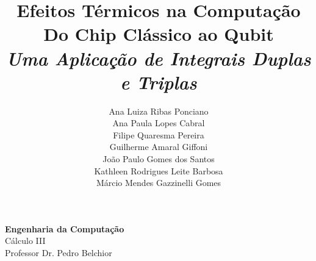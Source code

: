 \documentclass[a4paper, 12pt]{article}
\title{
    \textbf{Efeitos Térmicos na Computação} \\ 
    \large{
        Do Chip Clássico ao Qubit \\
        \textit{Uma Aplicação de Integrais Duplas e Triplas}
    }
}
\author{
    Ana Luiza Ribas Ponciano \\
    Ana Paula Lopes Cabral \\
    Filipe Quaresma Pereira \\
    Guilherme Amaral Giffoni \\
    João Paulo Gomes dos Santos \\
    Kathleen Rodrigues Leite Barbosa \\
    Márcio Mendes Gazzinelli Gomes
}
\begin{document}
\maketitle
\textbf{Engenharia da Computação} \\
Cálculo III \\
Professor Dr. Pedro Belchior
\newpage


\newpage


\newpage


\newpage


\newpage


\newpage


\newpage
\end{document}
